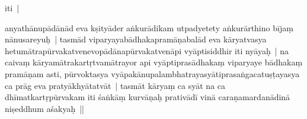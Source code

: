 \documentclass[article,12pt,a4paper]{memoir}%
\newcounter{parCount}
\begin{document}
	  
	  
	    \pstart  \leavevmode%
	    \hphantom{.}
	   iti | 
	{}
	\pend%
      

	  
	  \pstart \leavevmode%
	anyathānupādānād eva kṣityāder aṅkurādikam utpadyetety aṅkurārthino bījaṃ nānusareyuḥ | tasmād viparyayabādhakapramāṇabalād eva kāryatvasya hetumātrapūrvakatvenevopādānapūrvakatvenāpi vyāptisiddhir iti nyāyaḥ | na caivaṃ kāryamātrakartṛtvamātrayor api vyāptiprasādhakaṃ viparyaye bādhakaṃ pramāṇam asti, pūrvoktasya vyāpakānupalambhatrayasyātiprasaṅgacatuṣṭayasya ca prāg eva pratyākhyātatvāt | tasmāt kāryaṃ ca syāt na ca dhīmatkartṛpūrvakam iti śaṅkāṃ kurvāṇaḥ prativādī vinā caraṇamardanādinā niṣeddhum aśakyaḥ ||
	{}
	\pend%
      
\end{document}
